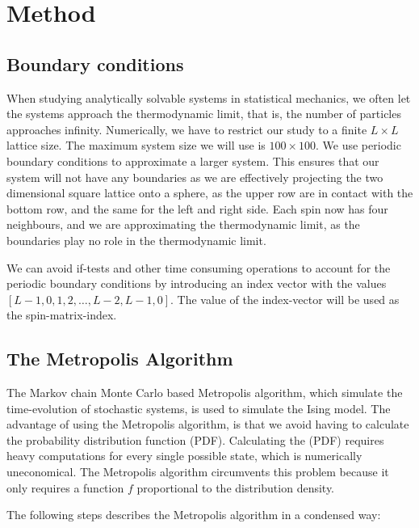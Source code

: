\documentclass[../main.tex]{subfiles}
\begin{document}
\section{Method}\label{sec:method}

\subsection{Boundary conditions}
When studying analytically solvable systems in statistical mechanics, we often let the systems approach the thermodynamic limit, that is, the number of particles approaches infinity. Numerically, we have to restrict our study to a finite $L\times L$ lattice size. The maximum system size we will use is $100\times 100$. We use periodic boundary conditions to approximate a larger system. This ensures that our system will not have any boundaries as we are effectively projecting the two dimensional square lattice onto a sphere, as the upper row are in contact with the bottom row, and the same for the left and right side. Each spin now has four neighbours, and we are approximating the thermodynamic limit, as the boundaries play no role in the thermodynamic limit. 

We can avoid if-tests and other time consuming operations to account for the periodic boundary conditions by introducing an index vector with the values \ensuremath{[L-1, 0, 1, 2, \ldots, L-2, L-1, 0]}. The value of the index-vector will be used as the spin-matrix-index.

\subsection{The Metropolis Algorithm}
\label{subsec:metropolis}
The Markov chain Monte Carlo based Metropolis algorithm, which simulate the time-evolution of stochastic systems, is used to simulate the Ising model. The advantage of using the Metropolis algorithm, is that we avoid having to calculate the probability distribution function (PDF). Calculating the (PDF) requires heavy computations for every single possible state, which is numerically uneconomical. The Metropolis algorithm circumvents this problem because it only requires a function $f$ proportional to the distribution density.

The following steps describes the Metropolis algorithm in a condensed way:
\end{document}
